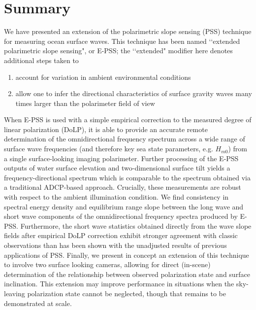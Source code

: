 \documentclass[letterpaper,journal]{IEEEtran}
\begin{document}


\section{Summary}
\label{sec:summary}

We have presented an extension of the polarimetric slope sensing (PSS) technique for measuring ocean surface waves. This technique has been named \lq\lq extended polarimetric slope sensing", or E-PSS; the \lq\lq extended" modifier here denotes additional steps taken to 

\begin{enumerate}
    \item account for variation in ambient environmental conditions
    \item allow one to infer the directional characteristics of surface gravity waves many times larger than the polarimeter field of view
\end{enumerate}

\noindent When E-PSS is used with a simple empirical correction to the measured degree of linear polarization (DoLP), it is able to provide an accurate remote determination of the omnidirectional frequency spectrum across a wide range of surface wave frequencies (and therefore key sea state parameters, e.g. $H_{m0}$) from a single surface-looking imaging polarimeter. Further processing of the E-PSS outputs of water surface elevation and two-dimensional surface tilt yields a frequency-directional spectrum which is comparable to the spectrum obtained via a traditional ADCP-based approach. Crucially, these measurements are robust with respect to the ambient illumination condition. We find consistency in spectral energy density and equilibrium range slope between the long wave and short wave components of the omnidirectional frequency spectra produced by E-PSS. Furthermore, the short wave statistics obtained directly from the wave slope fields after empirical DoLP correction exhibit stronger agreement with classic observations than has been shown with the unadjusted results of previous applications of PSS. Finally, we present in concept an extension of this technique to involve two surface looking cameras, allowing for direct (in-scene) determination of the relationship between observed polarization state and surface inclination. This extension may improve performance in situations when the sky-leaving polarization state cannot be neglected, though that remains to be demonstrated at scale.
\end{document}
